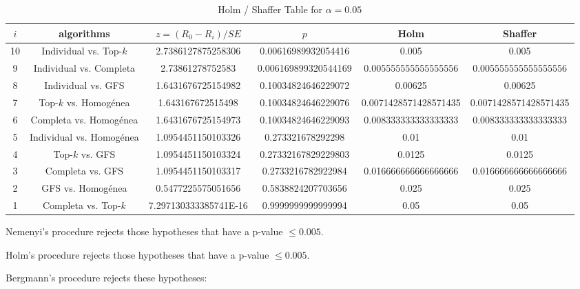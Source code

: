 \documentclass[a4paper,10pt]{article}
\begin{document}
\begin{landscape}
\begin{table}[!htp]
\centering\tiny
\caption{Holm / Shaffer Table for $\alpha=0.05$}
\begin{tabular}{cccccc}
$i$&algorithms&$z=(R_0 - R_i)/SE$&$p$&Holm&Shaffer\\
\hline
10&Individual vs. Top-$k$&2.7386127875258306&0.00616989932054416&0.005&0.005\\
9&Individual vs. Completa&2.73861278752583&0.006169899320544169&0.005555555555555556&0.005555555555555556\\
8&Individual vs. GFS&1.6431676725154982&0.10034824646229072&0.00625&0.00625\\
7&Top-$k$ vs. Homogénea&1.643167672515498&0.10034824646229076&0.0071428571428571435&0.0071428571428571435\\
6&Completa vs. Homogénea&1.6431676725154973&0.10034824646229093&0.008333333333333333&0.008333333333333333\\
5&Individual vs. Homogénea&1.0954451150103326&0.273321678292298&0.01&0.01\\
4&Top-$k$ vs. GFS&1.0954451150103324&0.27332167829229803&0.0125&0.0125\\
3&Completa vs. GFS&1.0954451150103317&0.2733216782922984&0.016666666666666666&0.016666666666666666\\
2&GFS vs. Homogénea&0.5477225575051656&0.5838824207703656&0.025&0.025\\
1&Completa vs. Top-$k$&7.297130333385741E-16&0.9999999999999994&0.05&0.05\\
\hline
\end{tabular}
\end{table}
Nemenyi's procedure rejects those hypotheses that have a p-value $\le0.005$.


Holm's procedure rejects those hypotheses that have a p-value $\le0.005$.


Bergmann's procedure rejects these hypotheses:


\begin{itemize}


\end{itemize}



\end{landscape}
\end{document}
